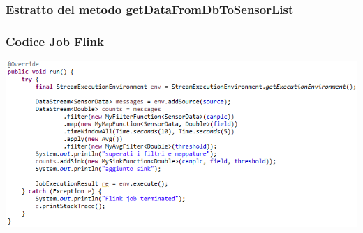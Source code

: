 \documentclass{beamer}
\begin{document}
\begin{frame}
\frametitle{Estratto del metodo getDataFromDbToSensorList}
\begin{figure}%
	\centering
	\qquad
\end{figure}
\end{frame}

\begin{frame}
\frametitle{Codice Job Flink}
\includegraphics[width=1\textwidth]{images/flink-job.png}
\end{frame}
\end{document}
